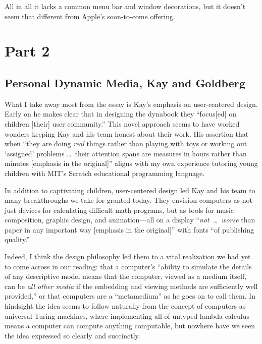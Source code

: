 \documentclass{abrice}
\begin{document}
All in all it lacks a common menu bar and window decorations, but it doesn't
seem that different from Apple's soon-to-come offering. 

\section{Part 2}

\subsection{Personal Dynamic Media, Kay and Goldberg}

What I take away most from the essay is Kay's emphasis on user-centered
design. Early on he makes clear that in designing the dynabook they ``focus[ed]
on children [their] user community.'' This novel approach seems to have worked
wonders keeping Kay and his team honest about their work. His assertion that
when ``they are doing \emph{real} things rather than playing with toys or
working out `assigned' problems \ldots\ their attention spans are measures in
hours rather than minutes [emphasis in the original]'' aligns with my own
experience tutoring young children with MIT's Scratch educational programming
language.

In addition to captivating children, user-centered design led Kay and his team
to many breakthroughs we take for granted today. They envision computers as not
just devices for calculating difficult math programs, but as tools for music
composition, graphic design, and animation---all on a display ``\emph{not}\,
\ldots\ \emph{worse} than paper in any important way [emphasis in the
original]'' with fonts ``of publishing quality.''

Indeed, I think the design philosophy led them to a vital realization we had yet
to come across in our reading: that a computer's ``ability to simulate the
details of any descriptive model means that the computer, viewed as a medium
itself, can be \emph{all other media} if the embedding and viewing methods are
sufficiently well provided,'' or that computers are a ``metamedium'' as he goes
on to call them. In hindsight the idea seems to follow naturally from the
concept of computers as universal Turing machines, where implementing all of
untyped lambda calculus means a computer can compute anything
computable, but
nowhere have we seen the idea expressed so clearly and succinctly.
\end{document}
